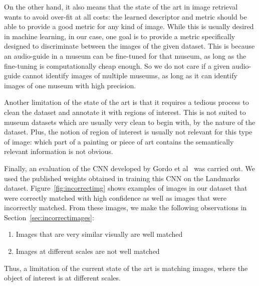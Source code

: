 On the other hand, it also means that the state of the art in
image retrieval wants to avoid over-fit at all costs:
the learned descriptor and metric should
be able to provide a good metric for any kind of image.
While this is usually desired in machine learning, in our case,
one goal is to provide a metric specifically designed
to discriminate between the images of the given dataset. This is because
an audio-guide in a museum can be fine-tuned for that museum, as long
as the fine-tuning is computationally cheap enough. So we do not care
if a given audio-guide cannot identify images of multiple museums,
as long as it can identify images of one museum with high precision.

Another limitation of the state of the art is that it requires
a tedious process to clean the dataset and annotate it with regions of
interest. This is not suited to museum datasets which are usually very
clean to begin with, by the nature of the dataset. Plus, the notion of
region of interest is usually not relevant for this type of image:
which part of a painting or piece of art contains the semantically
relevant information is not obvious.

Finally, an evaluation of the CNN developed by
Gordo et al~\cite{gordo_deep_2016} was carried out.
We used the published weights obtained in training this CNN on the
Landmarks dataset.
Figure~\ref{fig:incorrectimg}
shows examples of images in our dataset that were correctly matched
with high confidence as well as images that were incorrectly matched.
From these images, we make the following observations in
Section~\ref{sec:incorrectimages}:

\begin{enumerate}
    \item Images that are very similar visually are well matched
    \item Images at different scales are not well matched
\end{enumerate}

Thus, a limitation of the current state of the art is matching
images, where the object of interest is at different scales.
